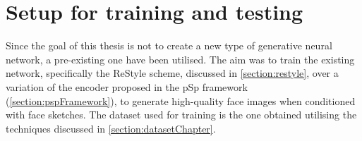\newpage
\section{Setup for training and testing} %
\label{sec:training and testing setup}
Since the goal of this thesis is not to create a new type of generative neural network, a pre-existing one have been utilised. The aim was to train the existing network, specifically the ReStyle scheme, discussed in \ref{section:restyle}, over a variation of the encoder proposed in the pSp framework (\ref{section:pspFramework}), to generate high-quality face images when conditioned with face sketches. 
The dataset used for training is the one obtained utilising the techniques discussed in \ref{section:datasetChapter}.
